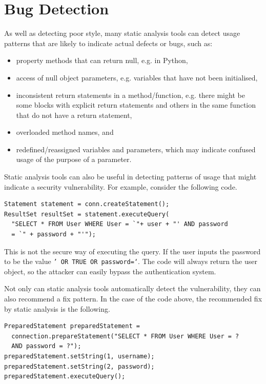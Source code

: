 \documentclass[a4paper, openany]{memoir}
\begin{document}
\section{Bug Detection}
As well as detecting poor style, many static analysis tools can detect usage patterns that are likely to indicate actual defects or bugs, such as:
\begin{itemize}
    \item property methods that can return null, e.g. in Python,
    \item access of null object parameters, e.g. variables that have not been initialised,
    \item inconsistent return statements in a method/function, e.g. there might be some blocks with explicit return statements and others in the same function that do not have a return statement,
    \item overloaded method names, and
    \item redefined/reassigned variables and parameters, which may indicate confused usage of the purpose of a parameter.
\end{itemize}

Static analysis tools can also be useful in detecting patterns of usage that might indicate a security vulnerability. For example, consider the following code.
\begin{verbatim}
Statement statement = conn.createStatement();
ResultSet resultSet = statement.executeQuery(
  "SELECT * FROM User WHERE User = `"+ user + "' AND password 
  = `" + password + "'");
\end{verbatim}
This is not the secure way of executing the query. If the user inputs the password to be the value \texttt{' OR TRUE OR password=`}. The code will always return the user object, so the attacker can easily bypass the authentication system.

Not only can static analysis tools automatically detect the vulnerability, they can also recommend a fix pattern. In the case of the code above, the recommended fix by static analysis is the following.
\begin{verbatim}
PreparedStatement preparedStatement =
  connection.prepareStatement("SELECT * FROM User WHERE User = ? 
  AND password = ?");
preparedStatement.setString(1, username);
preparedStatement.setString(2, password);
preparedStatement.executeQuery();
\end{verbatim}
\end{document}

